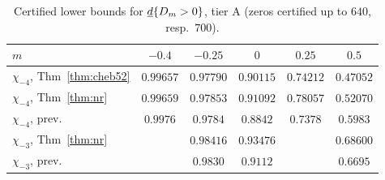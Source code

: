 \begin{table}[ht]\small
\caption{Certified lower bounds for $\underline d\{D_m>0\}$, tier A (zeros certified up to $640$, resp.\ $700$).}\label{tab:weights}
\begin{tabular}{lccccc}\toprule
$m$&$-0.4$&$-0.25$&$0$&$0.25$&$0.5$\\\midrule
$\chi_{-4}$, Thm~\ref{thm:cheb52}&$0.99657$&$0.97790$&$0.90115$&$0.74212$&$0.47052$\\
$\chi_{-4}$, Thm~\ref{thm:nr}&$0.99659$&$\mathbf{0.97853}$&$\mathbf{0.91092}$&$\mathbf{0.78057}$&$0.52070$\\
$\chi_{-4}$, prev.&$\mathbf{0.9976}$&$0.9784$&$0.8842$&$0.7378$&$\mathbf{0.5983}$\\
$\chi_{-3}$, Thm~\ref{thm:nr}&&$\mathbf{0.98416}$&$\mathbf{0.93476}$&&$\mathbf{0.68600}$\\
$\chi_{-3}$, prev.&&$0.9830$&$0.9112$&&$0.6695$\\\bottomrule
\end{tabular}
\end{table}

